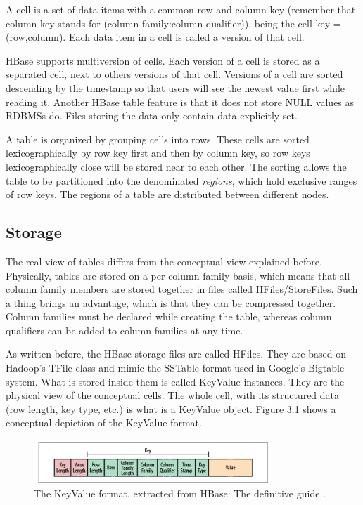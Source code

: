 A cell is a set of data items with a common row and column key (remember that column key stands for (column family:column qualifier)), being the cell key = (row,column). Each data item in a cell is called a version of that cell.
\par
HBase supports multiversion of cells. Each version of a cell is stored as a separated cell, next to others versions of that cell. Versions of a cell are sorted descending by the timestamp so that users will see the newest value first while reading it.
Another HBase table feature is that it does not store NULL values as RDBMSs do. Files storing the data only contain data explicitly set.
\par
A table is organized by grouping cells into rows. These cells are sorted lexicographically by row key first and then by column key, so row keys lexicographically close will be stored near to each other. The sorting allows the table to be partitioned into the denominated \textit{regions}, which hold exclusive ranges of row keys. The regions of a table are distributed between different nodes.

\subsection {Storage}

The real view of tables differs from the conceptual view explained before. Physically, tables are stored on a per-column family basis, which means that all column family members are stored together in files called HFiles/StoreFiles. Such a thing brings an advantage, which is that they can be compressed together. Column families must be declared while creating the table, whereas column qualifiers can be added to column families at any time.
\par
As written before, the HBase storage files are called HFiles. They are based on Hadoop's TFile \cite{TFile} class and mimic the SSTable format used in Google's Bigtable system. What is stored inside them is called KeyValue instances. They are the physical view of the conceptual cells. The whole cell, with its structured data (row length, key type, etc.) is what is a KeyValue object. Figure 3.1 shows a conceptual depiction of the KeyValue format.
\par

\begin{figure}[htb]
\centering
\includegraphics[width=0.8\textwidth]{./images/keyvalue.png}
\caption{The KeyValue format, extracted from HBase: The definitive guide \cite{george2011hbase}.} \label{fig:keyvalue}
\end{figure}


